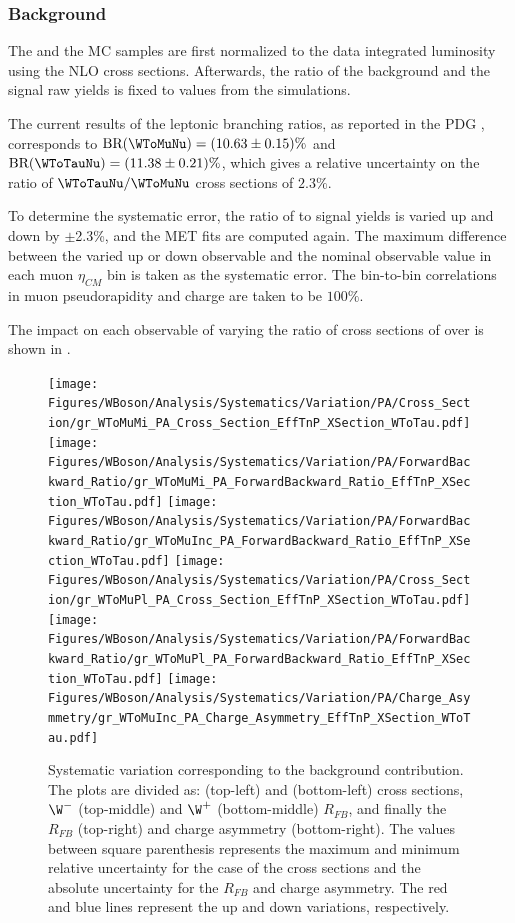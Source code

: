 \clearpage
\subsubsection{\texorpdfstring{\WToTauNu}\ Background}

The \WToTauNu and the \WToMuNu MC samples are first normalized to the data integrated luminosity using the \POWHEG NLO cross sections. Afterwards, the ratio of the \WToTauNu background and the signal raw yields is fixed to values from the simulations.

The current results of the \W leptonic branching ratios, as reported in the PDG \cite{PDG}, corresponds to $\textrm{BR}(\WToMuNu) = (10.63 \pm 0.15)\%$ and $\textrm{BR}(\WToTauNu) = (11.38 \pm 0.21)\%$, which gives a relative uncertainty on the ratio of $\WToTauNu/\WToMuNu$ cross sections of $2.3\%$.

To determine the systematic error, the ratio of \WToTauNu to signal yields is varied up and down by $\pm$2.3\%, and the MET fits are computed again. The maximum difference between the varied up or down observable and the nominal observable value in each muon $\eta_{CM}$ bin is taken as the systematic error. The bin-to-bin correlations in muon pseudorapidity and charge are taken to be $100\%$.

The impact on each observable of varying the ratio of cross sections of \WToTauNu over \WToMuNu is shown in .

\begin{figure}[htbp]
 \begin{center}
  \texttt{[image: Figures/WBoson/Analysis/Systematics/Variation/PA/Cross\_Section/gr\_WToMuMi\_PA\_Cross\_Section\_EffTnP\_XSection\_WToTau.pdf]}
  \texttt{[image: Figures/WBoson/Analysis/Systematics/Variation/PA/ForwardBackward\_Ratio/gr\_WToMuMi\_PA\_ForwardBackward\_Ratio\_EffTnP\_XSection\_WToTau.pdf]}
  \texttt{[image: Figures/WBoson/Analysis/Systematics/Variation/PA/ForwardBackward\_Ratio/gr\_WToMuInc\_PA\_ForwardBackward\_Ratio\_EffTnP\_XSection\_WToTau.pdf]}
  \texttt{[image: Figures/WBoson/Analysis/Systematics/Variation/PA/Cross\_Section/gr\_WToMuPl\_PA\_Cross\_Section\_EffTnP\_XSection\_WToTau.pdf]}
  \texttt{[image: Figures/WBoson/Analysis/Systematics/Variation/PA/ForwardBackward\_Ratio/gr\_WToMuPl\_PA\_ForwardBackward\_Ratio\_EffTnP\_XSection\_WToTau.pdf]}
  \texttt{[image: Figures/WBoson/Analysis/Systematics/Variation/PA/Charge\_Asymmetry/gr\_WToMuInc\_PA\_Charge\_Asymmetry\_EffTnP\_XSection\_WToTau.pdf]}
 \end{center}
 \caption{Systematic variation corresponding to the \WToTauNu background contribution. The plots are divided as: \WToMuNuMi (top-left) and \WToMuNuPl (bottom-left) cross sections, $\W^{-}$ (top-middle) and $\W^{+}$ (bottom-middle) $R_{FB}$, and finally the \W $R_{FB}$ (top-right) and \W charge asymmetry (bottom-right). The values between square parenthesis represents the maximum and minimum relative uncertainty for the case of the cross sections and the absolute uncertainty for the $R_{FB}$ and charge asymmetry. The red and blue lines represent the up and down variations, respectively.}
 \label{fig:Systematic_WToTau}
\end{figure}

